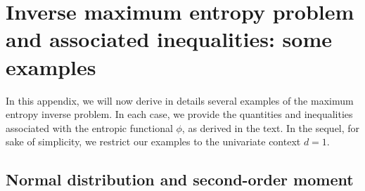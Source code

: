 \documentclass[entropy,article,submit,moreauthors,pdftex]{Definitions/mdpi}
\begin{document}
\vspace{6pt}

%
%
%
%
%




\appendixstart
\appendix


\section{Inverse  maximum  entropy  problem  and associated  inequalities:  some
  examples}
\label{secapp:MaxPhiEntExamples}

In this appendix, we will now derive  in details several examples of the maximum
entropy  inverse  problem.   In  each   case,  we  provide  the  quantities  and
inequalities associated with  the entropic functional $\phi$, as  derived in the
text. In  the sequel, for  sake of simplicity, we  restrict our examples  to the
univariate context $d = 1$.




\subsection{Normal distribution and second-order moment}
\label{subsecapp:NormalSecondOrder}
\end{document}
